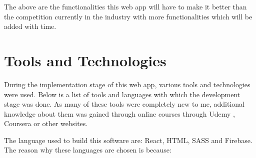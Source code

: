 The above are the functionalities this web app will have to make it better than the competition currently in the industry with more functionalities which will be added with time.

\section{Tools and Technologies}
During the implementation stage of this web app, various tools and technologies were used. Below is a list of tools and languages with which the development stage was done. As many of these tools were completely new to me, additional knowledge about them was gained through online courses through Udemy \parencite{Reference25}, Coursera \parencite{Reference26} or other websites. 

The language used to build this software are: React, HTML, SASS and Firebase. The reason why these languages are chosen is because:

